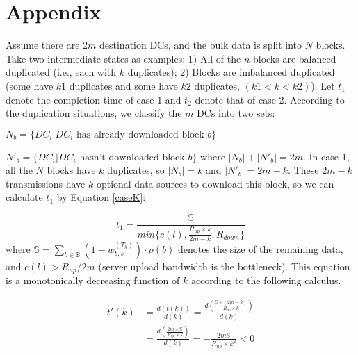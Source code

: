 \section{Appendix}
Assume there are $2m$ destination DCs, and the bulk data is split into $N$ blocks. 
Take two intermediate states as examples: 1) All of the $n$ blocks are balanced duplicated (i.e., each with $k$ duplicates); 2) Blocks are imbalanced duplicated (some have $k1$ duplicates and some have $k2$ duplicates, $(k1<k<k2)$). Let $t_1$ denote the completion time of case 1 and $t_2$ denote that of case 2. 
According to the duplication situations, we classify the $m$ DCs into two sets:

$N_b = \{DC_i|DC_i \text{ has already downloaded block $b$}\}$

$N'_b = \{DC_i|DC_i \text{ hasn't downloaded block $b$}\}$
where $|N_b| + |N'_b| = 2m$. In case 1, all the $N$ blocks have $k$ duplicates, so $|N_b| = k$ and $|N'_b| = 2m-k$. These $2m-k$ transmissions have $k$ optional data sources to download this block, 
so we can calculate $t_1$ by Equation \ref{caseK}:

\begin{equation}
\label{caseK}
t_1 = \frac{\mathbb{S}}{min\{c(l),\frac{R_{up}\times k}{2m-k},R_{down}\}}
\end{equation}
where $\mathbb{S}=\displaystyle{\sum_{b \in \mathbb{B}}} (1-w_{b,s}^{(T_k)}) \cdot \rho(b)$ denotes the size of the remaining data, and $c(l) > R_{up}/2m$ (server upload bandwidth is the bottleneck). This equation is a monotonically decreasing function of $k$ according to the following calculus.

\begin{equation}
\label{calculus}
\begin{split}
t'(k) &= \frac{d(t(k))}{d(k)} = \frac{d(\frac{\mathbb{S}\times (2m-k)}{R_{up}\times k})}{d(k)} \\
    &= \frac{d(\frac{2m\times \mathbb{S}}{R_{up}\times k})}{d(k)} = -\frac{2m\mathbb{S}}{R_{up}\times k^2} < 0
\end{split}
\end{equation}

